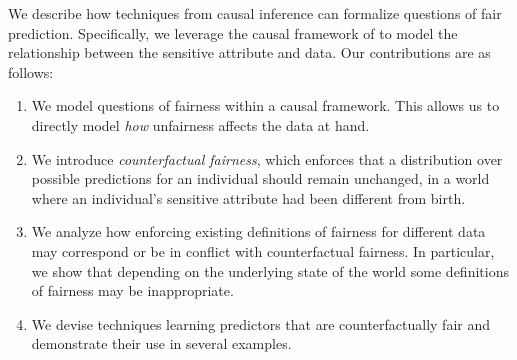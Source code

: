 % 

We describe how techniques from causal inference can formalize questions of fair prediction. Specifically, we
leverage the causal framework of 
\citet{pearl2009causal} to model the relationship between the sensitive
attribute and data. Our contributions are as follows:
\begin{enumerate}
    \item We model questions of fairness within a causal framework. This allows us to directly model \emph{how} unfairness affects the data at hand.
    \item We introduce \emph{counterfactual fairness}, which enforces that a distribution over possible predictions for an individual should remain unchanged, in a world where an individual's sensitive attribute had been different from birth.
    \item We analyze how enforcing existing definitions of fairness for different data may correspond or be in conflict with counterfactual fairness. In particular, we show that depending on the underlying state of the world some definitions of fairness may be inappropriate.
    \item We devise techniques learning predictors that are counterfactually fair and demonstrate their use in several examples.
\end{enumerate}





